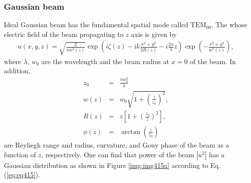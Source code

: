 \subsubsection{Gaussian beam}
Ideal Gaussian beam has the fundamental spatial mode called $\mathrm{TEM}_{00}$. The whose electric field of the beam propagating to $z$ axis is given by \cite{bond2016interferometer,svelto1998principles}
\begin{eqnarray}
  u(x, y, z)=\sqrt{\frac{2}{\pi{w^2(z)}}} \exp \left(i\zeta(z)-\mathrm{i} k \frac{x^{2} +y^{2}}{2 R(z)}-i\frac{2\pi}{\lambda}z\right)
  \exp \left(-\frac{x^{2}+y^{2}}{w^{2}(z)}\right),  \label{eq:eq415}
\end{eqnarray}
where $\lambda,\,w_0$ are the wavelength and the beam radius at $x=0$ of the beam. In addition,
\begin{eqnarray}
  z_0 &=& \frac{\pi{w^2_0}}{\lambda} \\ \label{eq:eq415_a}
  w(z) &=& w_0\sqrt{1+\left(\frac{z}{z_0}\right)^2}, \\ \label{eq:eq415_b}
  R(z) &=& z\left[1+\left(\frac{z_0}{z}\right)^2\right],\\ \label{eq:eq415_c}
  \phi(z) &=& \arctan\left(\frac{z}{z_0}\right) \label{eq:eq415_d}
\end{eqnarray}
are Reyliegh range and radius, curvature, and Gouy phase of the beam as a function of $z$, respectively. One can find that power of the beam $|u^2|$ has a Gaussian distribution as shown in Figure  \ref{img:img415a} according to Eq.(\ref{eq:eq415}). 


